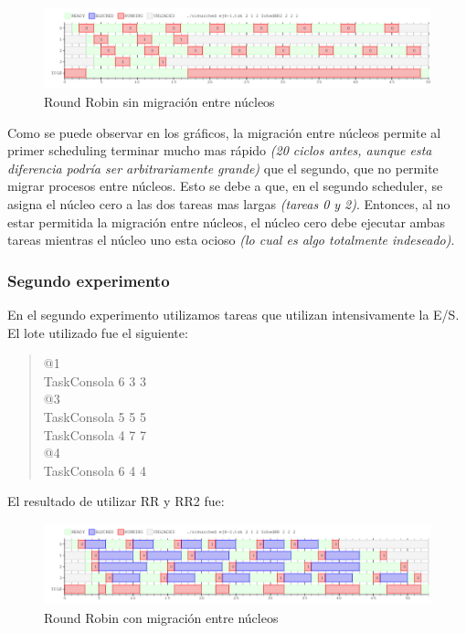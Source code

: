 \begin{figure}[H]
\begin{center}
\includegraphics[width=1.1\textwidth]{img/ej8-1-RR2.png}
     \caption{Round Robin sin migración entre núcleos}
\end{center}
\end{figure}

Como se puede observar en los gráficos, la migración entre núcleos permite al primer scheduling terminar mucho mas rápido \textit{(20 ciclos antes, aunque esta diferencia podría ser arbitrariamente grande)} que el segundo, que no permite migrar procesos entre núcleos.
Esto se debe a que, en el segundo scheduler, se asigna el núcleo cero a las dos tareas mas largas \textit{(tareas 0 y 2)}. Entonces, al no estar permitida la migración entre núcleos, el núcleo cero debe ejecutar ambas tareas mientras el núcleo uno esta ocioso \textit{(lo cual es algo totalmente indeseado)}.

\subsubsection{Segundo experimento}

En el segundo experimento utilizamos tareas que utilizan intensivamente la E/S.
El lote utilizado fue el siguiente:

\begin{quote}
@1\\
TaskConsola 6 3 3\\
@3\\
TaskConsola 5 5 5\\
TaskConsola 4 7 7\\
@4\\
TaskConsola 6 4 4\\
\end{quote}

El resultado de utilizar RR y RR2 fue:

\begin{figure}[H]
\begin{center}
\includegraphics[width=1.1\textwidth]{img/ej8-2-RR.png}
     \caption{Round Robin con migración entre núcleos}
\end{center}
\end{figure}

